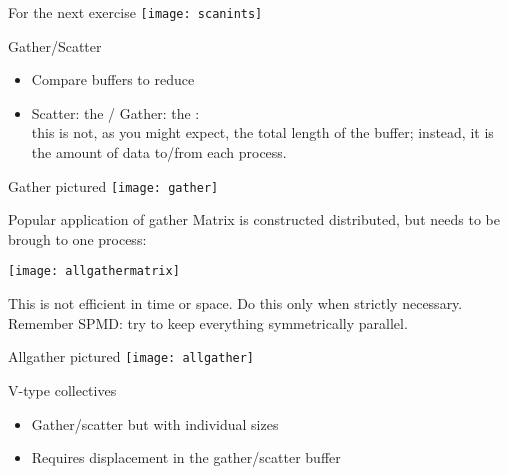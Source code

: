 
\begin{numberedframe}{For the next exercise}
  \texttt{[image: scanints]}
\end{numberedframe}

\begin{exerciseframe}[scangather]
  
\end{exerciseframe}



\begin{numberedframe}{Gather/Scatter}
\begin{itemize}
\item Compare buffers to reduce
\item Scatter: the  / Gather: the :\\
this is not, as you might expect, the total length of the
buffer; instead, it is the amount of data to/from each process.
\end{itemize}
\end{numberedframe}

\begin{numberedframe}{Gather pictured}
  \texttt{[image: gather]}
\end{numberedframe}

\begin{exerciseframe}
  
\end{exerciseframe}

\begin{numberedframe}{Popular application of gather}
  Matrix is constructed distributed, but needs to be brough to one
  process:
  
  \texttt{[image: allgathermatrix]}

  This is not efficient in time or space. Do this
  only when strictly necessary. Remember SPMD: try to keep everything
  symmetrically parallel. 
\end{numberedframe}


\begin{numberedframe}{Allgather pictured}
  \texttt{[image: allgather]}
\end{numberedframe}

\begin{numberedframe}{V-type collectives}
  \begin{itemize}
  \item Gather/scatter but with individual sizes
  \item Requires displacement in the gather/scatter buffer
  \end{itemize}
\end{numberedframe}

